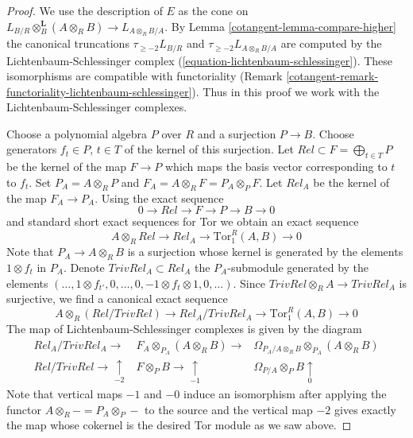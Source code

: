 \begin{proof}

We use the description of $E$ as the cone on
$L_{B/R} \otimes_B^\mathbf{L} (A \otimes_R B) \to L_{A \otimes_R B/A}$.
By Lemma \ref{cotangent-lemma-compare-higher} the canonical truncations
$\tau_{\geq -2}L_{B/R}$ and $\tau_{\geq -2}L_{A \otimes_R B/A}$
are computed by the Lichtenbaum-Schlessinger complex
(\ref{equation-lichtenbaum-schlessinger}).
These isomorphisms are compatible with functoriality
(Remark \ref{cotangent-remark-functoriality-lichtenbaum-schlessinger}).
Thus in this proof we work with the Lichtenbaum-Schlessinger complexes.

\medskip\noindent
Choose a polynomial algebra $P$ over $R$ and a surjection $P \to B$.
Choose generators $f_t \in P$, $t \in T$ of the kernel of this surjection.
Let $Rel \subset F = \bigoplus_{t \in T} P$ be the kernel of the map
$F \to P$ which maps the basis vector corresponding to $t$ to $f_t$.
Set $P_A = A \otimes_R P$ and $F_A = A \otimes_R F = P_A \otimes_P F$.
Let $Rel_A$ be the kernel of the map $F_A \to P_A$. Using the exact sequence
$$
0 \to Rel \to F \to P \to B \to 0
$$
and standard short exact sequences for Tor we obtain an exact sequence
$$
A \otimes_R Rel \to Rel_A \to \text{Tor}_1^R(A, B) \to 0
$$
Note that $P_A \to A \otimes_R B$ is a surjection whose kernel is generated
by the elements $1 \otimes f_t$ in $P_A$. Denote $TrivRel_A \subset Rel_A$
the $P_A$-submodule generated by the elements
$(\ldots, 1 \otimes f_{t'}, 0, \ldots,
0, - 1 \otimes f_t \otimes 1, 0, \ldots)$.
Since $TrivRel \otimes_R A \to TrivRel_A$ is surjective, we find a
canonical exact sequence
$$
A \otimes_R (Rel/TrivRel) \to Rel_A/TrivRel_A \to \text{Tor}_1^R(A, B) \to 0
$$
The map of Lichtenbaum-Schlessinger complexes is given by the diagram
$$
\begin{array}{ccc}Rel_A/TrivRel_A \longrightarrow & F_A \otimes_{P_A} (A \otimes_R B) \longrightarrow & \Omega_{P_A/A \otimes_R B} \otimes_{P_A} (A \otimes_R B) \\ Rel/TrivRel \longrightarrow\underset{-2}{\uparrow} & F \otimes_P B \longrightarrow\underset{-1}{\uparrow} & \Omega_{P/A} \otimes_P B \underset{0}{\uparrow}\end{array}
$$
Note that vertical maps $-1$ and $-0$ induce an isomorphism after applying
the functor $A \otimes_R - = P_A \otimes_P -$ to the source and the vertical
map $-2$ gives exactly the map whose cokernel is the desired Tor module
as we saw above.
\end{proof}

